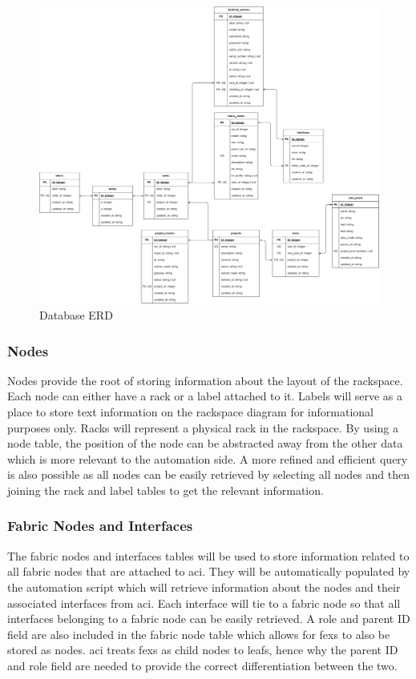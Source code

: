 \begin{figure}[H]
    \centering

    \includegraphics[scale=0.1]{images/erd.png}
    \caption{Database ERD}

    \label{fig:database-erd}
\end{figure}

\subsubsection{Nodes}
\label{design:web-application:database:nodes}
Nodes provide the root of storing
information about the layout of the rackspace. Each node can either have a rack
or a label attached to it. Labels will serve as a place to store text
information on the rackspace diagram for informational purposes only. Racks
will represent a physical rack in the rackspace. By using a node table, the
position of the node can be abstracted away from the other data which is more
relevant to the automation side. A more refined and efficient query is also
possible as all nodes can be easily retrieved by selecting all nodes and then
joining the rack and label tables to get the relevant information.

\subsubsection{Fabric Nodes and Interfaces}
\label{design:web-application:database:fabric-nodes-and-interfaces}
The fabric
nodes and interfaces tables will be used to store information related to all
fabric nodes that are attached to \gls{aci}. They will be automatically
populated by the automation script which will retrieve information about the
nodes and their associated interfaces from \gls{aci}. Each interface will tie
to a fabric node so that all interfaces belonging to a fabric node can be
easily retrieved. A role and parent ID field are also included in the fabric
node table which allows for \gls{fex}s to also be stored as nodes. \gls{aci}
treats \gls{fex}s as child nodes to leafs, hence why the parent ID and role
field are needed to provide the correct differentiation between the two.

